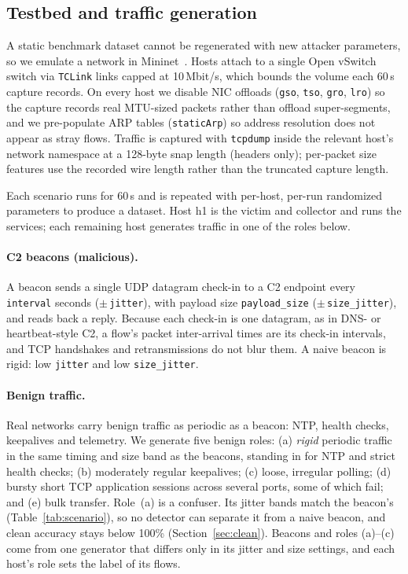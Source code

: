 \documentclass[preprint,12pt]{elsarticle}
\begin{document}
\subsection{Testbed and traffic generation}
\label{sec:testbed}
A static benchmark dataset cannot be regenerated with new attacker parameters, so we emulate a network
in Mininet~\cite{mininet2010}. Hosts attach to a single Open vSwitch switch via \texttt{TCLink} links
capped at 10\,Mbit/s, which bounds the volume each 60\,s capture records. On every host we disable NIC offloads (\texttt{gso}, \texttt{tso},
\texttt{gro}, \texttt{lro}) so the capture records real MTU-sized packets rather than offload
super-segments, and we pre-populate ARP tables (\texttt{staticArp}) so address resolution does not
appear as stray flows. Traffic is captured with \texttt{tcpdump} inside the relevant host's network
namespace at a 128-byte snap length (headers only); per-packet size features use the recorded wire
length rather than the truncated capture length.

Each scenario runs for 60\,s and is repeated with per-host, per-run randomized parameters to produce a
dataset. Host h1 is the victim and collector and runs the services; each remaining host generates
traffic in one of the roles below.

\paragraph{C2 beacons (malicious).} A beacon sends a single UDP datagram check-in to a C2 endpoint
every \texttt{interval} seconds ($\pm$\,\texttt{jitter}), with payload size \texttt{payload\_size}
($\pm$\,\texttt{size\_jitter}), and reads back a reply. Because each check-in is one datagram, as in
DNS- or heartbeat-style C2, a flow's packet inter-arrival times are its check-in intervals, and TCP
handshakes and retransmissions do not blur them. A naive beacon is rigid: low \texttt{jitter} and low
\texttt{size\_jitter}.

\paragraph{Benign traffic.} Real networks carry benign traffic as periodic as a beacon: NTP, health
checks, keepalives and telemetry. We generate five benign roles: (a) \emph{rigid} periodic traffic in
the same timing and size band as the beacons, standing in for NTP and strict health checks; (b)
moderately regular keepalives; (c) loose, irregular polling; (d) bursty short TCP application sessions
across several ports, some of which fail; and (e) bulk transfer. Role~(a) is a confuser. Its jitter
bands match the beacon's (Table~\ref{tab:scenario}), so no detector can separate it from a naive beacon,
and clean accuracy stays below 100\% (Section~\ref{sec:clean}). Beacons and roles (a)--(c) come from
one generator that differs only in its jitter and size settings, and each host's role sets the label of
its flows.
\end{document}
